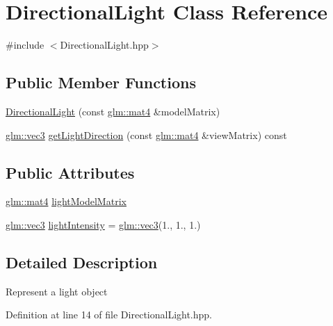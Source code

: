 \hypertarget{class_directional_light}{}\section{Directional\+Light Class Reference}
\label{class_directional_light}


{\ttfamily \#include $<$Directional\+Light.\+hpp$>$}

\subsection*{Public Member Functions}
\begin{DoxyCompactItemize}
\item 
\hyperlink{class_directional_light_ac57db47063c4b8174758ef8d305351c0}{Directional\+Light} (const \hyperlink{group__core__types_ga7dcd2365c2e368e6af5b7adeb6a9c8df}{glm\+::mat4} \&model\+Matrix)
\item 
\hyperlink{group__core__types_ga1c47e8b3386109bc992b6c48e91b0be7}{glm\+::vec3} \hyperlink{class_directional_light_a5e535357b3efa03980be8118b88ad031}{get\+Light\+Direction} (const \hyperlink{group__core__types_ga7dcd2365c2e368e6af5b7adeb6a9c8df}{glm\+::mat4} \&view\+Matrix) const
\end{DoxyCompactItemize}
\subsection*{Public Attributes}
\begin{DoxyCompactItemize}
\item 
\hyperlink{group__core__types_ga7dcd2365c2e368e6af5b7adeb6a9c8df}{glm\+::mat4} \hyperlink{class_directional_light_a7c01eb7c4d273af7e8b683e0f909e334}{light\+Model\+Matrix}
\item 
\hyperlink{group__core__types_ga1c47e8b3386109bc992b6c48e91b0be7}{glm\+::vec3} \hyperlink{class_directional_light_a0775cb1480596c0f38f09b996a4808ee}{light\+Intensity} = \hyperlink{group__core__types_ga1c47e8b3386109bc992b6c48e91b0be7}{glm\+::vec3}(1., 1., 1.)
\end{DoxyCompactItemize}


\subsection{Detailed Description}
Represent a light object 

Definition at line 14 of file Directional\+Light.\+hpp.



